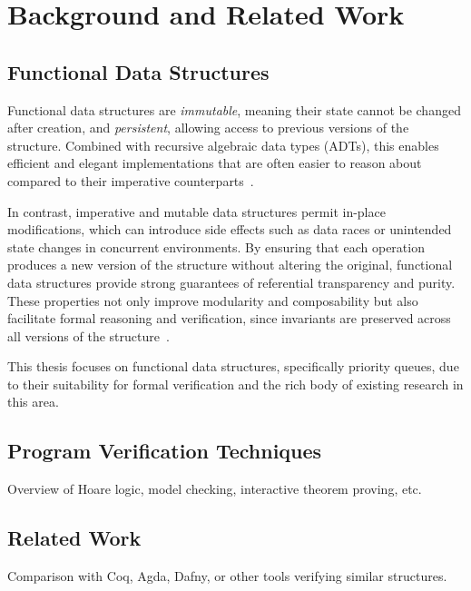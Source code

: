 \chapter { Background and Related Work }
\section { Functional Data Structures }
Functional data structures are \emph{immutable}, meaning their state cannot be changed after creation, and \emph{persistent}, allowing access to previous versions of the structure.
Combined with recursive algebraic data types (ADTs), this enables efficient and elegant implementations that are often easier to reason about compared to their imperative counterparts~\cite{okasaki}.

In contrast, imperative and mutable data structures permit in-place modifications, which can introduce side effects such as data races or unintended state changes in concurrent environments.
By ensuring that each operation produces a new version of the structure without altering the original, functional data structures provide strong guarantees of referential transparency and purity.
These properties not only improve modularity and composability but also facilitate formal reasoning and verification, since invariants are preserved across all versions of the structure~\cite{okasaki}.

This thesis focuses on functional data structures, specifically priority queues, due to their suitability for formal verification and the rich body of existing research in this area.

\section { Program Verification Techniques }
Overview of Hoare logic, model checking, interactive theorem proving, etc.

\section { Related Work }
Comparison with Coq, Agda, Dafny, or other tools verifying similar structures.

